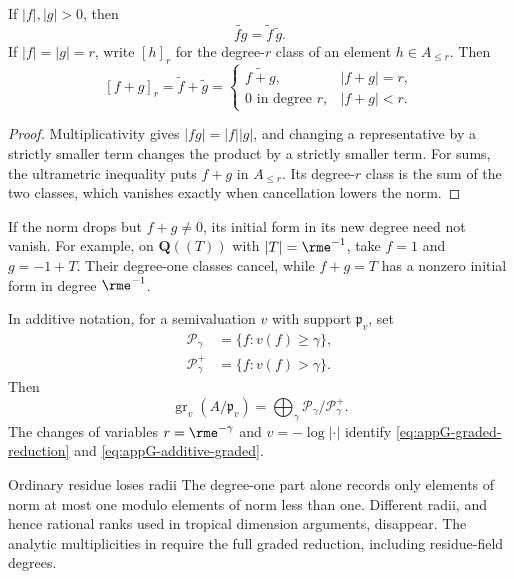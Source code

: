 \begin{proposition}\label{prop:appG-initial-calculus}
If \(|f|,|g|>0\), then
\[
                    \widetilde{fg}=\widetilde f\,\widetilde g.
\tag{G.14}\label{eq:appG-initial-product}
\]
If \(|f|=|g|=r\), write \([h]_r\) for the degree-\(r\) class of an
element \(h\in A_{\leq r}\).  Then
\[
 [f+g]_r=\widetilde f+\widetilde g=
 \begin{cases}
 \widetilde{f+g},&|f+g|=r,\\
 0\text{ in degree }r,&|f+g|<r.
 \end{cases}
\tag{G.15}\label{eq:appG-initial-sum}
\]
\end{proposition}

\begin{proof}
Multiplicativity gives \(|fg|=|f||g|\), and changing a representative by a
strictly smaller term changes the product by a strictly smaller term.
For sums, the ultrametric inequality puts \(f+g\) in \(A_{\leq r}\).
Its degree-\(r\) class is the sum of the two classes, which vanishes exactly
when cancellation lowers the norm.
\end{proof}

\begin{example}
\label{ex:appG-cancelled-degree}
If the norm drops but \(f+g\neq0\), its initial form in its new degree
need not vanish.  For example, on \(\mathbf Q((T))\) with
\(|T|=\rme^{-1}\), take \(f=1\) and \(g=-1+T\).  Their degree-one
classes cancel, while \(f+g=T\) has a nonzero initial form in degree
\(\rme^{-1}\).
\end{example}

In additive notation, for a semivaluation \(v\) with support
\(\mathfrak p_v\), set
\[
\begin{aligned}
 \mathcal P_\gamma&=\{f:v(f)\geq\gamma\},\\
 \mathcal P_\gamma^+&=\{f:v(f)>\gamma\}.
\end{aligned}
\]
Then
\[
 \operatorname{gr}_v(A/\mathfrak p_v)
 =
 \bigoplus_{\gamma}
 \mathcal P_\gamma/\mathcal P_\gamma^+.
\tag{G.16}\label{eq:appG-additive-graded}
\]
The changes of variables \(r=\rme^{-\gamma}\) and \(v=-\log|\cdot|\) identify
\eqref{eq:appG-graded-reduction} and
\eqref{eq:appG-additive-graded}.

\begin{warning}{Ordinary residue loses radii}
\label{warn:appG-residue-radii}
The degree-one part alone records only elements of norm at most one modulo
elements of norm less than one.
Different radii, and hence rational ranks used in tropical dimension
arguments, disappear.
The analytic multiplicities in
 require the full graded
reduction, including residue-field degrees.
\end{warning}

